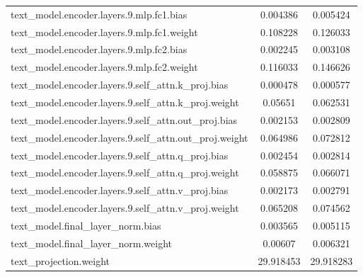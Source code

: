 \begin{longtable}{lcc}
text\_model.encoder.layers.9.mlp.fc1.bias & 0.004386 & 0.005424 \\
text\_model.encoder.layers.9.mlp.fc1.weight & 0.108228 & 0.126033 \\
text\_model.encoder.layers.9.mlp.fc2.bias & 0.002245 & 0.003108 \\
text\_model.encoder.layers.9.mlp.fc2.weight & 0.116033 & 0.146626 \\
text\_model.encoder.layers.9.self\_attn.k\_proj.bias & 0.000478 & 0.000577 \\
text\_model.encoder.layers.9.self\_attn.k\_proj.weight & 0.05651 & 0.062531 \\
text\_model.encoder.layers.9.self\_attn.out\_proj.bias & 0.002153 & 0.002809 \\
text\_model.encoder.layers.9.self\_attn.out\_proj.weight & 0.064986 & 0.072812 \\
text\_model.encoder.layers.9.self\_attn.q\_proj.bias & 0.002454 & 0.002814 \\
text\_model.encoder.layers.9.self\_attn.q\_proj.weight & 0.058875 & 0.066071 \\
text\_model.encoder.layers.9.self\_attn.v\_proj.bias & 0.002173 & 0.002791 \\
text\_model.encoder.layers.9.self\_attn.v\_proj.weight & 0.065208 & 0.074562 \\
text\_model.final\_layer\_norm.bias & 0.003565 & 0.005115 \\
text\_model.final\_layer\_norm.weight & 0.00607 & 0.006321 \\
text\_projection.weight & 29.918453 & 29.918283 \\

\end{longtable}

\twocolumn